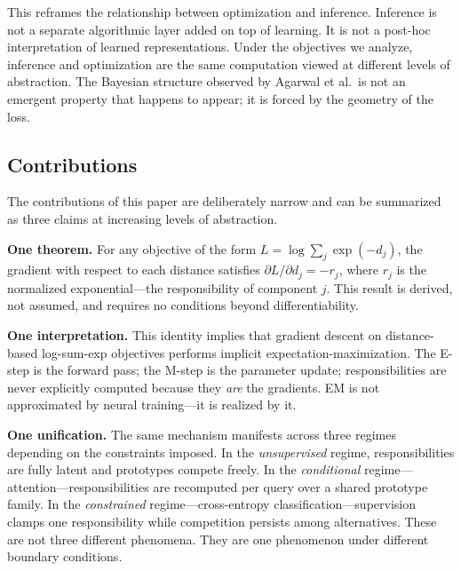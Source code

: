 This reframes the relationship between optimization and inference. Inference is not a separate algorithmic layer added on top of learning. It is not a post-hoc interpretation of learned representations. Under the objectives we analyze, inference and optimization are the same computation viewed at different levels of abstraction. The Bayesian structure observed by Agarwal et al.\ is not an emergent property that happens to appear; it is forced by the geometry of the loss.

\subsection{Contributions}

The contributions of this paper are deliberately narrow and can be summarized as three claims at increasing levels of abstraction.

\textbf{One theorem.} For any objective of the form $L = \log \sum_j \exp(-d_j)$, the gradient with respect to each distance satisfies $\partial L / \partial d_j = -r_j$, where $r_j$ is the normalized exponential---the responsibility of component $j$. This result is derived, not assumed, and requires no conditions beyond differentiability.

\textbf{One interpretation.} This identity implies that gradient descent on distance-based log-sum-exp objectives performs implicit expectation-maximization. The E-step is the forward pass; the M-step is the parameter update; responsibilities are never explicitly computed because they \emph{are} the gradients. EM is not approximated by neural training---it is realized by it.

\textbf{One unification.} The same mechanism manifests across three regimes depending on the constraints imposed. In the \emph{unsupervised} regime, responsibilities are fully latent and prototypes compete freely. In the \emph{conditional} regime---attention---responsibilities are recomputed per query over a shared prototype family. In the \emph{constrained} regime---cross-entropy classification---supervision clamps one responsibility while competition persists among alternatives. These are not three different phenomena. They are one phenomenon under different boundary conditions.
